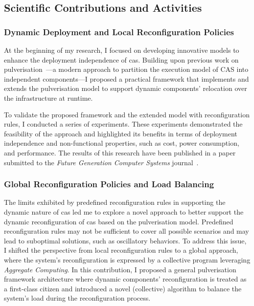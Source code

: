\documentclass[runningheads]{llncs}
\begin{document}
\subsection{Scientific Contributions and Activities}
\label{sec:scientific-contributions}

\subsubsection{Dynamic Deployment and Local Reconfiguration Policies}
At the beginning of my research,
I focused on developing innovative models to enhance the deployment independence of \ac{cas}.
%
Building upon previous work on pulverisation~\cite{DBLP:journals/fi/CasadeiPPVW20,DBLP:journals/iotj/CasadeiFPPSV22}---a modern approach to partition the execution model of CAS into independent components---I proposed a practical framework that implements and extends the pulverisation model to support dynamic components' relocation over the infrastructure at runtime.

To validate the proposed framework and the extended model with reconfiguration rules,
I conducted a series of experiments.
%
These experiments demonstrated the feasibility of the approach and highlighted its benefits in terms of deployment independence and non-functional properties,
such as cost,
power consumption,
and performance.
%
The results of this research have been published in a paper submitted to the \emph{Future Generation Computer Systems} journal~\cite{DBLP:journals/fgcs/FarabegoliPCV24}.

\subsubsection{Global Reconfiguration Policies and Load Balancing}
The limits exhibited by predefined reconfiguration rules in supporting the dynamic nature of \ac{cas} led me to explore a novel approach to better support the dynamic reconfiguration of \ac{cas} based on the pulverisation model.
%
Predefined reconfiguration rules may not be sufficient to cover all possible scenarios and may lead to suboptimal solutions,
such as oscillatory behaviors.
%
To address this issue,
I shifted the perspective from local reconfiguration rules to a global approach,
where the system's reconfiguration is expressed by a collective program leveraging \emph{Aggregate Computing}.
%
In this contribution,
I proposed a general pulverisation framework architecture where dynamic components' reconfiguration is treated as a first-class citizen and introduced a novel (collective) algorithm to balance the system's load during the reconfiguration process.
\end{document}
